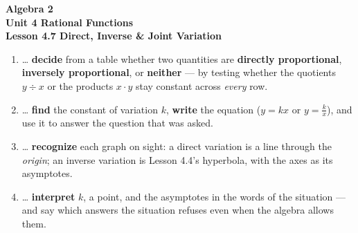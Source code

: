 \documentclass[10pt]{article}
\begin{document}
\vspace{-0.8in}

\begin{center}
  {\color{white}\textbf{\LARGE Algebra 2}}\\[4pt]
  {\color{forestmid}\large\textbf{Unit 4 \quad Rational Functions}}\\[6pt]
  {\color{white}\textbf{\large Lesson 4.7 \quad Direct, Inverse \& Joint Variation}}
\end{center}

\vspace{0.22in}
\namedateperiod
\vspace{0.18in}

\begin{learningtargetbox}
\small
\begin{enumerate}[leftmargin=1.5em, itemsep=5pt]
  \item \ldots{} \textbf{decide} from a table whether two quantities are \textbf{directly
        proportional}, \textbf{inversely proportional}, or \textbf{neither} --- by testing whether the
        quotients $y\div x$ or the products $x\cdot y$ stay constant across \emph{every} row.
  \item \ldots{} \textbf{find} the constant of variation $k$, \textbf{write} the equation ($y=kx$ or
        $y=\frac kx$), and use it to answer the question that was asked.
  \item \ldots{} \textbf{recognize} each graph on sight: a direct variation is a line through the
        \emph{origin}; an inverse variation is Lesson 4.4's hyperbola, with the axes as its asymptotes.
  \item \ldots{} \textbf{interpret} $k$, a point, and the asymptotes in the words of the situation ---
        and say which answers the situation refuses even when the algebra allows them.
\end{enumerate}
\end{learningtargetbox}

\vspace{0.14in}
\end{document}
